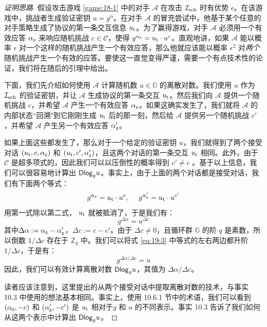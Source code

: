 \begin{proof}[证明思路]
假设攻击游戏 \ref{game:18-1} 中的对手 $\mathcal{A}$ 在攻击 $\mathcal{I}_{\rm sch}$ 时有优势 $\epsilon$。在该游戏中，挑战者生成验证密钥 $u=g^\alpha$。在对手 $\mathcal{A}$ 的冒充尝试中，他基于某个任意的对手策略生成了协议的第一条交互信息 $u_{\rm t}$。为了赢得游戏，对手 $\mathcal{A}$ 必须用一个有效应答 $\alpha_{\rm z}$ 来响应随机挑战 $c\in\mathcal{C}$，使得 $g^{\alpha_{\rm z}}=u_{\rm t}\cdot u^c$。直观地讲，如果 $\mathcal{A}$ 能以概率 $\epsilon$ 对一个这样的随机挑战产生一个有效应答，那么他就应该能以概率 $\epsilon^2$ 对\emph{两个}随机挑战产生一个有效的应答。要使这一直觉变得严谨，需要一个有点技术性的论证，我们将在随后的引理中给出。

下面，我们先介绍如何使用 $\mathcal{A}$ 计算随机数 $u\in\mathbb{G}$ 的离散对数。我们使用 $u$ 作为 $\mathcal{I}_{\rm sch}$ 的验证密钥，并让 $\mathcal{A}$ 生成协议的第一条交互 $u_{\rm t}$。然后我们向 $\mathcal{A}$ 提供一个随机挑战 $c$，并希望 $\mathcal{A}$ 产生一个有效应答 $\alpha_{\rm z}$。如果这确实发生了，我们就将 $\mathcal{A}$ 的内部状态``回溯"到它刚刚生成 $u_{\rm t}$ 后的那一刻，然后给 $\mathcal{A}$ 提供另一个随机挑战 $c'$，并希望 $\mathcal{A}$ 产生另一个有效应答 $\alpha_{\rm z}'$。

如果上面这些都发生了，那么对于一个给定的验证密钥 $u$，我们就得到了两个接受对话 $(u_{\rm t},c,\alpha_{\rm z})$ 和 $(u_{\rm t},c',\alpha_{\rm z}')$，且这两个对话的第一条交互 $u_{\rm t}$ 相同。此外，由于 $\mathcal{C}$ 是超多项式的，因此我们可以以压倒性的概率得到 $c'\neq c$ 。基于以上信息，我们可以很容易地计算出 ${\rm \mathsf{Dlog}}_gu$。事实上，由于上面的两个对话都是接受对话，我们有下面两个等式：
$$g^{\alpha_{\rm z}}=u_{\rm t}\cdot u^c,~~~~
g^{\alpha_{\rm z}'} =u_{\rm t}\cdot u^{c'}$$
用第一式除以第二式， $u_{\rm t}$ 就被抵消了，于是我们有：
\begin{equation}\label{eq:19-3}
	g^{\Delta\alpha}=u^{\Delta c}
\end{equation}
其中$\Delta\alpha:=\alpha_{\rm z}-\alpha_{\rm z}'$，$\Delta c:=c-c'$。由于 $\Delta c\neq 0$，且循环群 $\mathbb{G}$ 的阶 $q$ 是素数，所以倒数 ${1}/{\Delta c}$ 存在于 $\mathbb{Z}_q$ 中。我们可以将式 \ref{eq:19-3} 中等式的左右两边都升阶 ${1}/{\Delta c}$，于是有：
	$$g^{{\Delta\alpha}/{\Delta c}}=u$$
因此，我们可以有效计算离散对数 ${\rm \mathsf{Dlog}}_gu$，其值为 ${\Delta\alpha}/{\Delta c}$。

读者应该注意到，这里提出的从两个接受对话中提取离散对数的技术，与事实 10.3 中使用的想法基本相同。事实上，使用 10.6.1 节中的术语，我们可以看到 $(\alpha_{\rm z},-c)$ 和 $(\alpha_{\rm z}',-c')$ 是 $u_{\rm t}$ 相对于$g$ 和 $u$ 的不同表示。事实 10.3 告诉了我们如何从这两个表示中计算出 ${\rm \mathsf{Dlog}}_gu$。
\end{proof}


